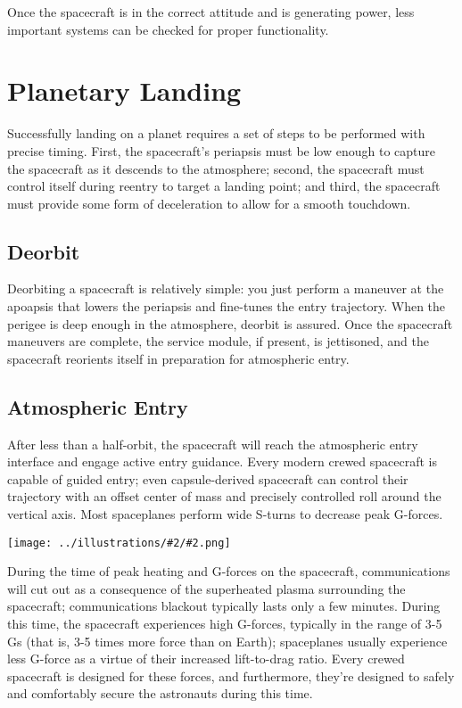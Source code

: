 \documentclass[oneside,a5paper]{book}
\newcommand{\widthillustration}[2]{{\centering\texttt{[image: ../illustrations/\#2/\#2.png]}}}
\newcommand{\illustration}[1]{\widthillustration{\linewidth}{#1}}
\newcommand{\afterchapter}{\vspace{1em}}
\begin{document}
Once the spacecraft is in the correct attitude and is generating
power, less important systems can be checked for proper functionality.

\chapter{Planetary Landing}

\afterchapter

Successfully landing on a planet requires a set of steps to be
performed with precise timing. First, the spacecraft’s periapsis must
be low enough to capture the spacecraft as it descends to the
atmosphere; second, the spacecraft must control itself during reentry
to target a landing point; and third, the spacecraft must provide some
form of deceleration to allow for a smooth touchdown.

\section{Deorbit}

Deorbiting a spacecraft is relatively simple: you just perform a
maneuver at the apoapsis that lowers the periapsis and fine-tunes the
entry trajectory. When the perigee is deep enough in the atmosphere,
deorbit is assured. Once the spacecraft maneuvers are complete, the
service module, if present, is jettisoned, and the spacecraft
reorients itself in preparation for atmospheric entry.

\section{Atmospheric Entry}

After less than a half-orbit, the spacecraft will reach the
atmospheric entry interface and engage active entry guidance. Every
modern crewed spacecraft is capable of guided entry; even
capsule-derived spacecraft can control their trajectory with an offset
center of mass and precisely controlled roll around the vertical
axis. Most spaceplanes perform wide S-turns to decrease peak G-forces.

\illustration{reentry-capsule-control}

During the time of peak heating and G-forces on the spacecraft,
communications will cut out as a consequence of the superheated plasma
surrounding the spacecraft; communications blackout typically lasts
only a few minutes. During this time, the spacecraft experiences high
G-forces, typically in the range of 3-5 Gs (that is, 3-5 times more
force than on Earth); spaceplanes usually experience less G-force as a
virtue of their increased lift-to-drag ratio. Every crewed spacecraft
is designed for these forces, and furthermore, they’re designed to
safely and comfortably secure the astronauts during this time.
\end{document}
